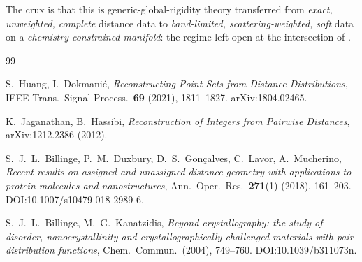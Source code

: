 \documentclass[11pt]{article}
\begin{document}
The crux is that this is generic-global-rigidity theory transferred from
\emph{exact, unweighted, complete} distance data to \emph{band-limited,
scattering-weighted, soft} data on a \emph{chemistry-constrained manifold}:
the regime left open at the intersection of
\cite{HuangDokmanic2021,JaganathanHassibi2012,Billinge2018}.

\begin{thebibliography}{99}

S.~Huang, I.~Dokmani\'c,
\emph{Reconstructing Point Sets from Distance Distributions},
IEEE Trans.\ Signal Process.\ \textbf{69} (2021), 1811--1827.
arXiv:1804.02465.

K.~Jaganathan, B.~Hassibi,
\emph{Reconstruction of Integers from Pairwise Distances},
arXiv:1212.2386 (2012).

S.~J.~L.~Billinge, P.~M.~Duxbury, D.~S.~Gon\c{c}alves, C.~Lavor,
A.~Mucherino,
\emph{Recent results on assigned and unassigned distance geometry with
applications to protein molecules and nanostructures},
Ann.\ Oper.\ Res.\ \textbf{271}(1) (2018), 161--203.
DOI:10.1007/s10479-018-2989-6.

S.~J.~L.~Billinge, M.~G.~Kanatzidis,
\emph{Beyond crystallography: the study of disorder, nanocrystallinity and
crystallographically challenged materials with pair distribution functions},
Chem.\ Commun.\ (2004), 749--760.
DOI:10.1039/b311073n.

\end{thebibliography}
\end{document}
